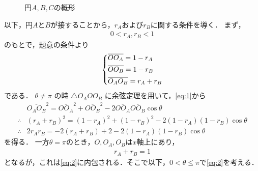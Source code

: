 \documentclass[a4paper,10pt]{ltjsarticle}
\begin{document}
\begin{multicols}{2}
\begin{figure}[H]
    \caption{円$A,B,C$の概形}
  \end{figure}

  以下，円$A$と$B$が接することから，$r_A$および$r_B$に関する条件を導く．
  まず，
  \begin{align*}
    0 < r_A, r_B < 1
  \end{align*}
  のもとで，題意の条件より
  \begin{align}
    \begin{dcases}
      \overline{OO_A}    = 1-r_A \\
      \overline{OO_B}    = 1-r_B \\
      \overline{O_AO_B} = r_A+r_B
    \end{dcases}\label{eq:1}
  \end{align}
  である．
  $\theta\neq\pi$ の時 $\triangle O_A O O_B$ に余弦定理を用いて，\cref{eq:1}から
  \begin{align}
               & \overline{O_A O_B}^2 = \overline{OO_A}^2 + \overline{OO_B}^2 -2 \overline{OO_A}\overline{OO_B}\cos\theta \nonumber \\
    \therefore & (r_A+r_B)^2 = (1-r_A)^2 + (1-r_B)^2 - 2(1-r_A)(1-r_B)\cos\theta                                          \nonumber \\
    \therefore & 2r_A r_B = -2(r_A+r_B) + 2 - 2(1-r_A)(1-r_B)\cos\theta \label{eq:2}
  \end{align}
  を得る．
  一方$\theta=\pi$のとき，$O,O_A,O_B$は$x$軸上にあり，
  \begin{align*}
    r_A+r_B = 1
  \end{align*}
  となるが，これは\cref{eq:2}に内包される．そこで以下，$0<\theta\le\pi$で\cref{eq:2}を考える．


\end{multicols}
\end{document}
